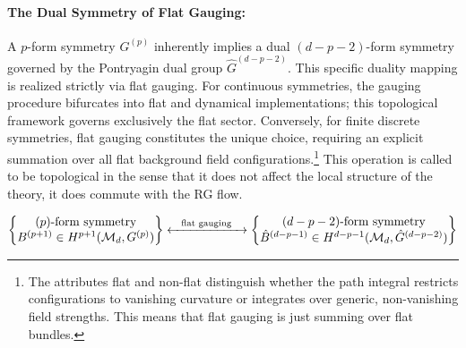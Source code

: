 \documentclass[aps,preprint,nofootinbib,preprintnumbers,eqsecnum,superscriptaddress]{revtex4}
\numberwithin{equation}{section}
\begin{document}
\paragraph*{The Dual Symmetry of Flat Gauging:} 
A $p$-form symmetry $G^{(p)}$ inherently implies a dual $(d-p-2)$-form symmetry governed by the Pontryagin dual group $\hat{G}^{(d-p-2)}$. This specific duality mapping is realized strictly via flat gauging. For continuous symmetries, the gauging procedure bifurcates into flat and dynamical implementations; this topological framework governs exclusively the flat sector. Conversely, for finite discrete symmetries, flat gauging constitutes the unique choice, requiring an explicit summation over all flat background field configurations.\footnote{The attributes flat and non-flat distinguish whether the path integral restricts configurations to vanishing curvature or integrates over generic, non-vanishing field strengths. This means that flat gauging is just summing over flat bundles.} This operation is called to be topological in the sense that it does not affect the local structure of the theory, it does commute with the RG flow.

\begin{align}
    \left\{ \begin{matrix} 
    (p)\text{-form symmetry} \\ 
    B^{(p+1)} \in H^{p+1}(\mathcal{M}_d,G^{(p)})
    \end{matrix} \right\} 
 \xleftrightarrow{\text{\quad flat gauging \quad}}
\left\{ \begin{matrix} 
    (d-p-2)\text{-form symmetry} \\ 
    \hat{B}^{(d-p-1)} \in H^{d-p-1}(\mathcal{M}_d,\hat G^{(d-p-2)})
    \end{matrix} \right\} 
\end{align}
\end{document}
